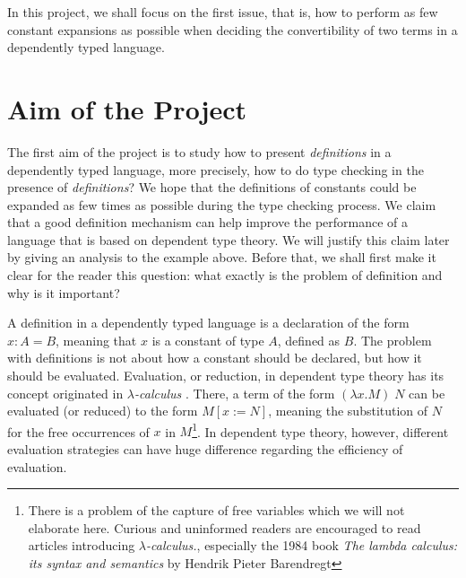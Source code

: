 In this project, we shall focus on the first issue, that is, how to perform as few constant expansions as possible when deciding the convertibility of two terms in a dependently typed language. 

\section{Aim of the Project}
The first aim of the project is to study how to present \emph{definitions} in a dependently typed language, more precisely, how to do type checking in the presence of \emph{definitions}? We hope that the definitions of constants could be expanded as few times as possible during the type checking process. We claim that a good definition mechanism can help improve the performance of a language that is based on dependent type theory. We will justify this claim later by giving an analysis to the example above. Before that, we shall first make it clear for the reader this question: what exactly is the problem of definition and why is it important?

A definition in a dependently typed language is a declaration of the form $x : A = B$, meaning that $x$ is a constant of type $A$, defined as $B$. The problem with definitions is not about how a constant should be declared, but how it should be evaluated. Evaluation, or reduction, in dependent type theory has its concept originated in \emph{$\lambda$-calculus} \cite{barendregt1984lambda}. There, a term of the form $(\lambda x . M) \;N$ can be evaluated (or reduced) to the form $M[x := N]$, meaning the substitution of $N$ for the free occurrences of $x$ in $M$\footnote{There is a problem of the capture of free variables which we will not elaborate here. Curious and uninformed readers are encouraged to read articles introducing \emph{$\lambda$-calculus.}, especially the 1984 book \emph{The lambda calculus: its syntax and semantics} by Hendrik Pieter Barendregt}. In dependent type theory, however, different evaluation strategies can have huge difference regarding the efficiency of evaluation. 

